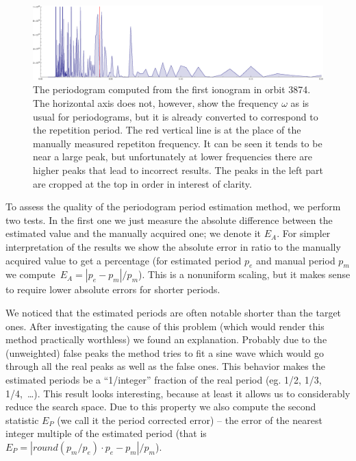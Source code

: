 \begin{figure}
	\centering
	\includegraphics[width=140mm]{images/periodogram_from_normalized_peaks_orbit_3874_000.eps}
	\caption{The periodogram computed from the first ionogram in orbit 3874. The horizontal axis does not, however, show the frequency $\omega$ as is usual for periodograms, but it is already converted to correspond to the repetition period. The red vertical line is at the place of the manually measured repetiton frequency. It can be seen it tends to be near a large peak, but unfortunately at lower frequencies there are higher peaks that lead to incorrect results. The peaks in the left part are cropped at the top in order in interest of clarity.}
	\label{fig:periodogram}
\end{figure}
 
To assess the quality of the periodogram period estimation method, we perform two tests. In the first one we just measure the absolute difference between the estimated value and the manually acquired one; we denote it $E_A$. For simpler interpretation of the results we show the absolute error in ratio to the manually acquired value to get a percentage (for estimated period $p_e$ and manual period $p_m$ we compute~$E_A=|p_e-p_m|/p_m$). This is a nonuniform scaling, but it makes sense to require lower absolute errors for shorter periods.

We noticed that the estimated periods are often notable shorter than the target ones. After investigating the cause of this problem (which would render this method practically worthless) we found an explanation. Probably due to the (unweighted) false peaks the method tries to fit a sine wave which would go through all the real peaks as well as the false ones. This behavior makes the estimated periods be a ``1/integer'' fraction of the real period (eg. 1/2, 1/3, 1/4,~\ldots). This result looks interesting, because at least it allows us to considerably reduce the search space. Due to this property we also compute the second statistic $E_P$ (we call it the period corrected error) -- the error of the nearest integer multiple of the estimated period (that is $E_P=|round(p_m/p_e)\cdot p_e-p_m|/p_m$).

